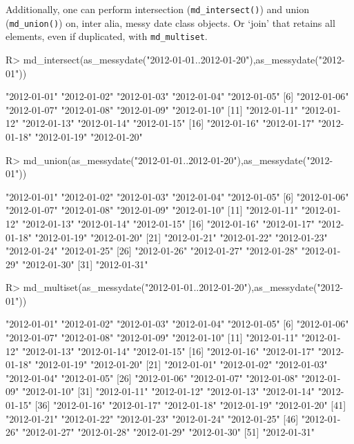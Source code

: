 \documentclass[
]{jss}
\begin{document}
Additionally, one can perform intersection (\texttt{md\_intersect()})
and union (\texttt{md\_union()}) on, inter alia, messy date class
objects. Or `join' that retains all elements, even if duplicated, with
\texttt{md\_multiset}.

\begin{CodeChunk}
\begin{CodeInput}
R> md_intersect(as_messydate("2012-01-01..2012-01-20"),as_messydate("2012-01"))
\end{CodeInput}
\begin{CodeOutput}
 [1] "2012-01-01" "2012-01-02" "2012-01-03" "2012-01-04" "2012-01-05"
 [6] "2012-01-06" "2012-01-07" "2012-01-08" "2012-01-09" "2012-01-10"
[11] "2012-01-11" "2012-01-12" "2012-01-13" "2012-01-14" "2012-01-15"
[16] "2012-01-16" "2012-01-17" "2012-01-18" "2012-01-19" "2012-01-20"
\end{CodeOutput}
\begin{CodeInput}
R> md_union(as_messydate("2012-01-01..2012-01-20"),as_messydate("2012-01"))
\end{CodeInput}
\begin{CodeOutput}
 [1] "2012-01-01" "2012-01-02" "2012-01-03" "2012-01-04" "2012-01-05"
 [6] "2012-01-06" "2012-01-07" "2012-01-08" "2012-01-09" "2012-01-10"
[11] "2012-01-11" "2012-01-12" "2012-01-13" "2012-01-14" "2012-01-15"
[16] "2012-01-16" "2012-01-17" "2012-01-18" "2012-01-19" "2012-01-20"
[21] "2012-01-21" "2012-01-22" "2012-01-23" "2012-01-24" "2012-01-25"
[26] "2012-01-26" "2012-01-27" "2012-01-28" "2012-01-29" "2012-01-30"
[31] "2012-01-31"
\end{CodeOutput}
\begin{CodeInput}
R> md_multiset(as_messydate("2012-01-01..2012-01-20"),as_messydate("2012-01"))
\end{CodeInput}
\begin{CodeOutput}
 [1] "2012-01-01" "2012-01-02" "2012-01-03" "2012-01-04" "2012-01-05"
 [6] "2012-01-06" "2012-01-07" "2012-01-08" "2012-01-09" "2012-01-10"
[11] "2012-01-11" "2012-01-12" "2012-01-13" "2012-01-14" "2012-01-15"
[16] "2012-01-16" "2012-01-17" "2012-01-18" "2012-01-19" "2012-01-20"
[21] "2012-01-01" "2012-01-02" "2012-01-03" "2012-01-04" "2012-01-05"
[26] "2012-01-06" "2012-01-07" "2012-01-08" "2012-01-09" "2012-01-10"
[31] "2012-01-11" "2012-01-12" "2012-01-13" "2012-01-14" "2012-01-15"
[36] "2012-01-16" "2012-01-17" "2012-01-18" "2012-01-19" "2012-01-20"
[41] "2012-01-21" "2012-01-22" "2012-01-23" "2012-01-24" "2012-01-25"
[46] "2012-01-26" "2012-01-27" "2012-01-28" "2012-01-29" "2012-01-30"
[51] "2012-01-31"
\end{CodeOutput}
\end{CodeChunk}
\end{document}
